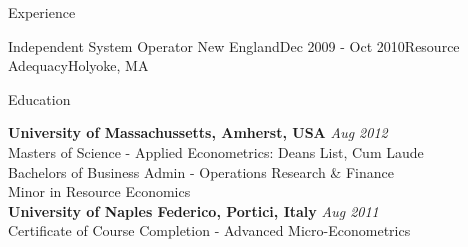 \documentclass{resume} %
\begin{document}
\begin{rSection}{Experience}
\begin{rSubsection}{Independent System Operator New England}{Dec 2009 - Oct 2010}{Resource Adequacy}{Holyoke, MA}
\end{rSubsection}


% 
\end{rSection}


\begin{rSection}{Education}

{\bf University of Massachussetts, Amherst, USA} \hfill {\em Aug 2012} \\
Masters of Science -  Applied Econometrics: Deans List, Cum Laude \\
Bachelors of Business Admin - Operations Research \& Finance \\
Minor in Resource Economics \\

{\bf University of Naples Federico, Portici, Italy} \hfill {\em Aug 2011} \\
Certificate of Course Completion - Advanced Micro-Econometrics \\

\end{rSection}

\end{document}
